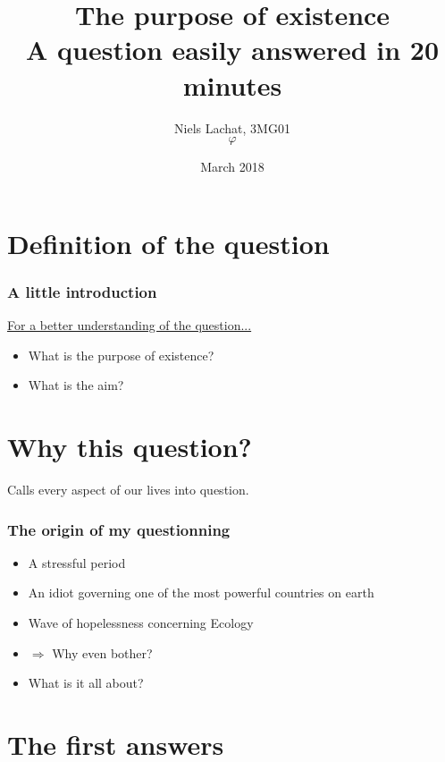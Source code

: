 \documentclass{beamer}
\title{The purpose of existence \\ A question easily answered in 20 minutes}
\author{Niels Lachat, 3MG01 \\ $\varphi$}
\date{March 2018}
\begin{document}
	\maketitle
	
	\tableofcontents
	
	\section{Definition of the question}
	
	\begin{frame}
		\frametitle{A little introduction} 
		\href{../orig.gif}{For a better understanding of the question...} \pause
		
		\begin{itemize}[<+->]
			\item What is the purpose of existence?
			\item What is the aim? 
		\end{itemize}
    \end{frame}
    
    
    \section{Why this question?}
    Calls every aspect of our lives into question.
    \begin{frame}
    		\frametitle{The origin of my questionning}
    		
    		\begin{itemize}[<+->]
    			\item A stressful period 
    			\item An idiot governing one of the most powerful countries on earth
    			\item Wave of hopelessness concerning Ecology
    			\item $\Rightarrow$ Why even bother? 
    			\item What is it all about?
    		\end{itemize}
    \end{frame}
    
    
    \section{The first answers}
    
\end{document}

